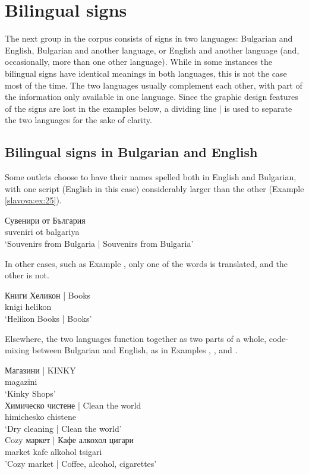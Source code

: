 \documentclass[output=paper]{langscibook}
\begin{document}
\section{Bilingual signs}\label{slavova:sec:6}
The next group in the corpus consists of signs in two languages: Bulgarian and English, Bulgarian and another language, or English and another language (and, occasionally, more than one other language). While in some instances the bilingual signs have identical meanings in both languages, this is not the case most of the time. The two languages usually complement each other, with part of the information only available in one language. Since the graphic design features of the signs are lost in the examples below, a dividing line | is used to separate the two languages for the sake of clarity.

\subsection{Bilingual signs in Bulgarian and English}
Some outlets choose to have their names spelled both in English and Bulgarian, with one script (English in this case) considerably larger than the other (Example \ref{slavova:ex:25}).

\begin{exe}
  \ex\label{slavova:ex:25}
   Сувенири от България \\
  { } suveniri ot balgariya \\
  \glt ‘Souvenirs from Bulgaria | Souvenirs from Bulgaria’
\end{exe}

\noindent
In other cases, such as Example , only one of the words is translated, and the other is not.

\begin{exe}
  \ex\label{slavova:ex:26}
  \gll Книги Хеликон {| Books} \\
  knigi helikon { } \\
  \glt ‘Helikon Books | Books’
\end{exe}

\noindent
Elsewhere, the two languages function together as two parts of a whole, code-mixing between Bulgarian and English, as in Examples , , and . 

\begin{exe}
  \ex\label{slavova:ex:27}
  \gll Магазини {| KINKY} \\
  magazini { } \\
  \glt ‘Kinky Shops’ \\
  \ex\label{slavova:ex:28}
  \gll Химическо чистене {| Clean the world} \\
  himichesko chistene { } \\
  \glt ‘Dry cleaning | Clean the world’ \\
  \ex\label{slavova:ex:29}
  \gll Cozy маркет | Кафе алкохол цигари \\
  { } market { } kafe alkohol tsigari \\
  \glt ’Cozy market | Coffee, alcohol, cigarettes’
\end{exe}
\end{document}
